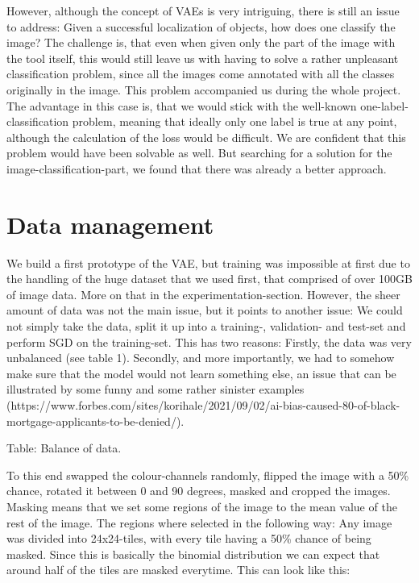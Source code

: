 However, although the concept of VAEs is very intriguing, there is still an issue to address: Given a successful localization of objects, how does one classify the image?
The challenge is, that even when given only the part of the image with the tool itself, this would still leave us with having to solve a rather unpleasant classification problem, since all the images come annotated with all the classes originally in the image. This problem accompanied us during the whole project. The advantage in this case is, that we would stick with the well-known one-label-classification problem, meaning that ideally only one label is true at any point, although the calculation of the loss would be difficult. We are confident that this problem would have been solvable as well. But searching for a solution for the image-classification-part, we found that there was already a better approach.

\section{Data management}

We build a first prototype of the VAE, but training was impossible at first due to the handling of the huge dataset that we used first, that comprised of over 100GB of image data. More on that in the experimentation-section. However, the sheer amount of data was not the main issue, but it points to another issue: We could not simply take the data, split it up into a training-, validation- and test-set and perform SGD on the training-set. 
This has two reasons: Firstly, the data was very unbalanced (see table 1). Secondly, and more importantly, we had to somehow make sure that the model would not learn something else, an issue that can be illustrated by some funny and some rather sinister examples (https://www.forbes.com/sites/korihale/2021/09/02/ai-bias-caused-80-of-black-mortgage-applicants-to-be-denied/).

Table: Balance of data.

To this end swapped the colour-channels randomly, flipped the image with a 50\% chance, rotated it between 0 and 90 degrees, masked and cropped the images. Masking means that we set some regions of the image to the mean value of the rest of the image. The regions where selected in the following way: Any image was divided into 24x24-tiles, with every tile having a 50\% chance of being masked. Since this is basically the binomial distribution we can expect that around half of the tiles are masked everytime. This can look like this:

